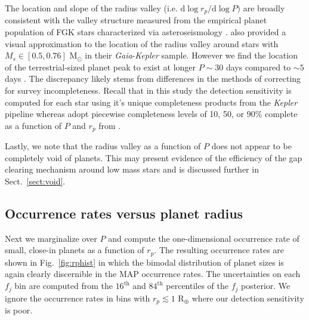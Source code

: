 \documentclass[twocolumn]{emulateapj}
\newcommand{\gaia}[1]{\emph{Gaia}#1}
\newcommand{\kepler}[1]{\emph{Kepler}#1}
\begin{document}
The location and slope of the radius valley (i.e. $\text{d}\log{r_p}/\text{d}\log{P})$ are broadly consistent
with the valley structure measured from the empirical planet population of FGK stars characterized via
asteroseismology \citep{vaneylen18}. \cite{wu19} also provided a visual approximation to the location of the
radius valley around stars with $M_s \in [0.5,0.76]$ M$_{\odot}$ in their \gaia{-}\kepler{} sample. However
we find the location of the terrestrial-sized planet peak to exist at longer $P \sim 30$ days compared to
$\sim 5$ days \citep[c.f. Fig. 2,][]{wu19}. The discrepancy likely stems from differences in the methods of
correcting for survey incompleteness. Recall that in this study the detection sensitivity is computed for each
star using it's unique completeness products from the \kepler{} pipeline whereas \cite{wu19} adopt piecewise
completeness levels of 10, 50, or 90\% complete as a function of $P$ and $r_p$ from \cite{zhu18b}.  

Lastly, we note that the radius valley as a function of $P$ does not appear to be completely void of planets.
This may present evidence of the efficiency of the gap clearing mechanism around low mass stars and is
discussed further in Sect.~\ref{sect:void}.

\subsection{Occurrence rates versus planet radius}
Next we marginalize over $P$ and compute the one-dimensional occurrence rate of small, close-in planets
as a function of $r_p$. The resulting occurrence rates are shown in Fig.~\ref{fig:rphist} in which the bimodal
distribution of planet sizes is again clearly discernible in the MAP occurrence rates.
The uncertainties on each $f_j$ bin are computed from the $16^{\text{th}}$ and $84^{\text{th}}$ percentiles
of the $f_j$ posterior. We ignore the occurrence rates in bins with $r_p\lesssim 1$ R$_{\oplus}$ where our
detection sensitivity is poor.
\end{document}
